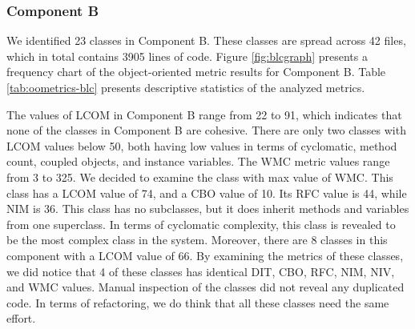 



\subsubsection{Component B}
We identified 23 classes in Component B. These classes are spread across 42 files, which in total contains 3905 lines of code. Figure \ref{fig:blcgraph} presents a frequency chart of the object-oriented metric results for Component B. Table \ref{tab:oometrics-blc} presents descriptive statistics of the analyzed metrics.

The values of LCOM in Component B range from 22 to 91, which indicates that none of the classes in Component B are cohesive. There are only two classes with LCOM values below 50, both having low values in terms of cyclomatic, method count, coupled objects, and instance variables. The WMC metric values range from 3 to 325. We decided to examine the class with max value of WMC. This class has a LCOM value of 74, and a CBO value of 10. Its RFC value is 44, while NIM is 36. This class has no subclasses, but it does inherit methods and variables from one superclass. In terms of cyclomatic complexity, this class is revealed to be the most complex class in the system. Moreover, there are 8 classes in this component with a LCOM value of 66. By examining the metrics of these classes, we did notice that 4 of these classes has identical DIT, CBO, RFC, NIM, NIV, and WMC values. Manual inspection of the classes did not reveal any duplicated code. In terms of refactoring, we do think that all these classes need the same effort.



